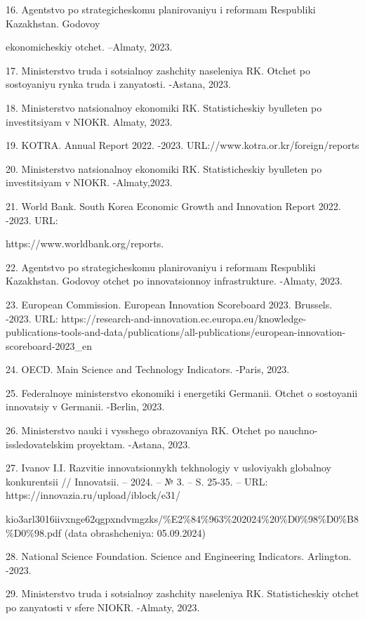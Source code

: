 \begin{noparindent}
16. Agentstvo po strategicheskomu planirovaniyu i reformam Respubliki
Kazakhstan. Godovoy

ekonomicheskiy otchet. --Almaty, 2023.

17. Ministerstvo truda i sotsial\textquotesingle noy zashchity
naseleniya RK. Otchet po sostoyaniyu rynka truda i zanyatosti. -Astana,
2023.

18. Ministerstvo natsional\textquotesingle noy ekonomiki RK.
Statisticheskiy byulleten\textquotesingle{} po investitsiyam v NIOKR.
Almaty, 2023.

19. KOTRA. Annual Report 2022. -2023.
URL://www.kotra.or.kr/foreign/reports

20. Ministerstvo natsional\textquotesingle noy ekonomiki RK.
Statisticheskiy byulleten\textquotesingle{} po investitsiyam v NIOKR.
-Almaty,2023.

21. World Bank. South Korea Economic Growth and Innovation Report 2022.
-2023. URL:

https://www.worldbank.org/reports.

22. Agentstvo po strategicheskomu planirovaniyu i reformam Respubliki
Kazakhstan. Godovoy otchet po innovatsionnoy infrastrukture. -Almaty,
2023.

23. European Commission. European Innovation Scoreboard 2023. Brussels.
-2023. URL:
https://research-and-innovation.ec.europa.eu/knowledge-publications-tools-and-data/publications/all-publications/european-innovation-scoreboard-2023\_en

24. OECD. Main Science and Technology Indicators. -Paris, 2023.

25. Federal\textquotesingle noye ministerstvo ekonomiki i energetiki
Germanii. Otchet o sostoyanii innovatsiy v Germanii. -Berlin, 2023.

26. Ministerstvo nauki i vysshego obrazovaniya RK. Otchet po
nauchno-issledovatelskim proyektam. -Astana, 2023.

27. Ivanov I.I. Razvitie innovatsionnykh tekhnologiy v usloviyakh
globalnoy konkurentsii // Innovatsii. -- 2024. -- № 3. -- S. 25-35. --
URL:
https://innovazia.ru/upload/iblock/e31/

kio3arl3016iivxnge62qgpxndvmgzks/\%E2\%84\%963\%202024\%20\%D0\%98\%D0\%B8\%D0\%98.pdf
(data obrashcheniya: 05.09.2024)

28. National Science Foundation. Science and Engineering Indicators.
Arlington. -2023.

29. Ministerstvo truda i sotsial\textquotesingle noy zashchity
naseleniya RK. Statisticheskiy otchet po zanyatosti v sfere NIOKR.
-Almaty, 2023.


\end{noparindent}
